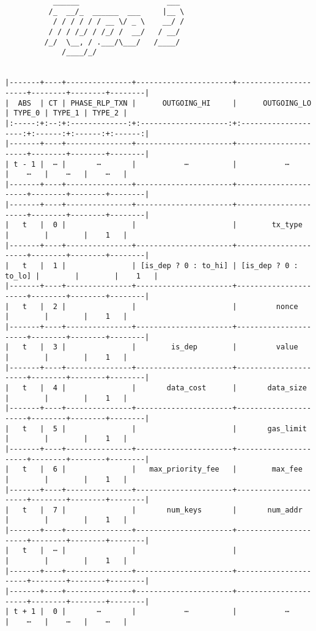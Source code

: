 \documentclass[varwidth=\maxdimen,margin=0.5cm,multi={verbatim}]{standalone}
\begin{document}
\begin{verbatim}
           ______                    ___ 
          /_  __/_  ______  ___     |__ \
           / / / / / / __ \/ _ \    __/ /
          / / / /_/ / /_/ /  __/   / __/ 
         /_/  \__, / .___/\___/   /____/ 
             /____/_/


|-------+----+---------------+----------------------+----------------------+--------+--------+--------|
|  ABS  | CT | PHASE_RLP_TXN |      OUTGOING_HI     |      OUTGOING_LO     | TYPE_0 | TYPE_1 | TYPE_2 |
|:-----:+:--:+:-------------:+:--------------------:+:--------------------:+:------:+:------:+:------:|
|-------+----+---------------+----------------------+----------------------+--------+--------+--------|
| t - 1 |  ⋯ |       ⋯       |           ⋯          |           ⋯          |    ⋯   |    ⋯   |    ⋯   |
|-------+----+---------------+----------------------+----------------------+--------+--------+--------|
|-------+----+---------------+----------------------+----------------------+--------+--------+--------|
|   t   |  0 |               |                      |        tx_type       |        |        |    1   |
|-------+----+---------------+----------------------+----------------------+--------+--------+--------|
|   t   |  1 |               | [is_dep ? 0 : to_hi] | [is_dep ? 0 : to_lo] |        |        |    1   |
|-------+----+---------------+----------------------+----------------------+--------+--------+--------|
|   t   |  2 |               |                      |         nonce        |        |        |    1   |
|-------+----+---------------+----------------------+----------------------+--------+--------+--------|
|   t   |  3 |               |        is_dep        |         value        |        |        |    1   |
|-------+----+---------------+----------------------+----------------------+--------+--------+--------|
|   t   |  4 |               |       data_cost      |       data_size      |        |        |    1   |
|-------+----+---------------+----------------------+----------------------+--------+--------+--------|
|   t   |  5 |               |                      |       gas_limit      |        |        |    1   |
|-------+----+---------------+----------------------+----------------------+--------+--------+--------|
|   t   |  6 |               |   max_priority_fee   |        max_fee       |        |        |    1   |
|-------+----+---------------+----------------------+----------------------+--------+--------+--------|
|   t   |  7 |               |       num_keys       |       num_addr       |        |        |    1   |
|-------+----+---------------+----------------------+----------------------+--------+--------+--------|
|   t   |  ⋯ |               |                      |                      |        |        |    1   |
|-------+----+---------------+----------------------+----------------------+--------+--------+--------|
|-------+----+---------------+----------------------+----------------------+--------+--------+--------|
| t + 1 |  0 |       ⋯       |           ⋯          |           ⋯          |    ⋯   |    ⋯   |    ⋯   |

\end{verbatim}
\end{document}
